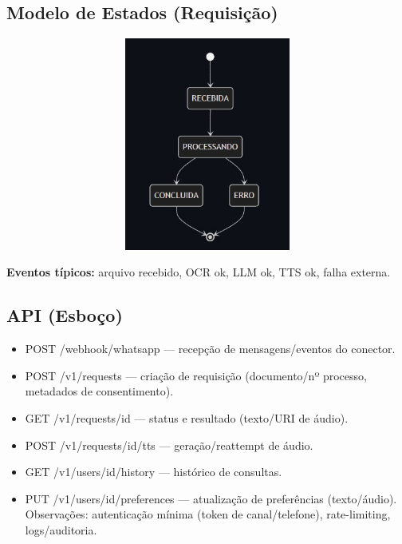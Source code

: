 \documentclass{article}
\begin{document}
\subsection{Modelo de Estados (Requisição)}
\includegraphics[width=3\textwidth,height=7cm,keepaspectratio]{images/Modelo-de-Estados.jpg}

\textbf{Eventos típicos:} arquivo recebido, OCR ok, LLM ok, TTS ok, falha externa.

\newpage

\subsection{API (Esboço)}
\begin{itemize}
    \item POST /webhook/whatsapp — recepção de mensagens/eventos do conector.
    \item POST /v1/requests — criação de requisição (documento/nº processo, metadados de consentimento).
    \item GET /v1/requests/{id} — status e resultado (texto/URI de áudio).
    \item POST /v1/requests/{id}/tts — geração/reattempt de áudio.
    \item GET /v1/users/{id}/history — histórico de consultas.
    \item PUT /v1/users/{id}/preferences — atualização de preferências (texto/áudio). Observações: autenticação mínima (token de canal/telefone), rate-limiting, logs/auditoria.
\end{itemize}
\end{document}
